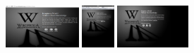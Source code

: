 \documentclass{acm_proc_article-sp}
\newcommand{\thumbheight}{16mm}
\newenvironment{thumbsequence}{}{\makebox[4mm]{}}
\begin{document}
\begin{figure}
\begin{centering}
\begin{thumbsequence}
		\includegraphics[height=\thumbheight]{resources/sopa/looseduplicate10.png}
		\includegraphics[height=\thumbheight]{resources/sopa/looseduplicate11.jpg}
		\includegraphics[height=\thumbheight]{resources/sopa/looseduplicate12.jpg}

\end{thumbsequence}
\end{centering}
\end{figure}
\end{document}
